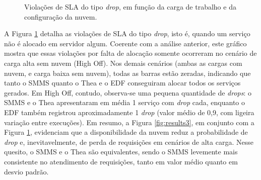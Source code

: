 \begin{figure}[ht!]
    \caption{Violações de SLA do tipo \textit{drop}, em função da carga de trabalho e da configuração da nuvem.}
    \label{fig:results4}
\end{figure}

A Figura \ref{fig:results4} detalha as violações de SLA do tipo \textit{drop}, isto é, quando um serviço não é alocado em servidor algum. Coerente com a análise anterior, este gráfico mostra que essas violações por falta de alocação somente ocorreram no cenário de carga alta sem nuvem (High Off). Nos demais cenários (ambas as cargas com nuvem, e carga baixa sem nuvem), todas as barras estão zeradas, indicando que tanto o SMMS quanto o Thea e o EDF conseguiram alocar todos os serviços gerados. Em High Off, contudo, observa-se uma pequena quantidade de \textit{drops}: o SMMS e o Thea apresentaram em média 1 serviço com \textit{drop} cada, enquanto o EDF também registrou aproximadamente 1 \textit{drop} (valor médio de 0,9, com ligeira variação entre execuções). Em resumo, a Figura \ref{fig:results3}, em conjunto com a Figura \ref{fig:results4}, evidenciam que a disponibilidade da nuvem reduz a probabilidade de \textit{drop} e, inevitavelmente, de perda de requisições em cenários de alta carga. Nesse quesito, o SMMS e o Thea são equivalentes, sendo o SMMS levemente mais consistente no atendimento de requisições, tanto em valor médio quanto em desvio padrão.

